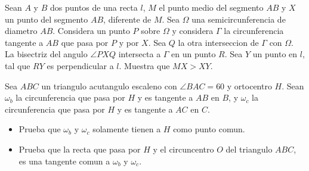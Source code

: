 \documentclass[11pt]{scrartcl}
\begin{document}
\begin{problem}
[2018/1] Sean $A$ y $B$ dos puntos de una recta $l$, $M$ el punto medio del segmento $AB$ y $X$ un punto del segmento $AB$, diferente de $M$. Sea $\Omega$ una semicircunferencia de diametro $AB$. Considera un punto $P$ sobre $\Omega$ y considera $\Gamma$ la circunferencia tangente a $AB$ que pasa por $P$ y por $X$. Sea $Q$ la otra interseccion de $\Gamma$ con $\Omega$. La bisectriz del angulo $\angle{PXQ}$ intersecta a $\Gamma$ en un punto $R$. Sea $Y$ un punto en $l$, tal que $RY$ es perpendicular a $l$. Muestra que $MX>XY$.
\end{problem}
\begin{problem}
[2021/4] Sea $ABC$ un triangulo acutangulo escaleno con $\angle{BAC}=60$ y ortocentro $H$. Sean $\omega_b$ la circunferencia que pasa por $H$ y es tangente a $AB$ en $B$,  y $\omega_c$ la circunferencia que pasa por $H$ y es tangente a $AC$ en $C$. 
\begin{itemize}
\item Prueba que $\omega_b$ y $\omega_c$ solamente tienen a $H$ como punto comun.
\item Prueba que la recta que pasa por $H$ y el circuncentro $O$ del triangulo $ABC$, es una tangente comun a $\omega_b$ y $\omega_c$.
\end{itemize}
\end{problem}
\end{document}
